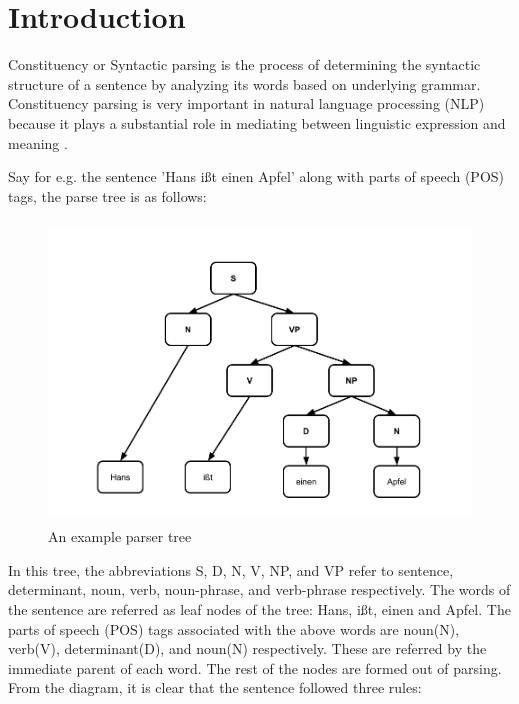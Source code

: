 \documentclass[a4paper, 11pt]{article}
\begin{document}
\tableofcontents
\pagebreak

\listoffigures
\pagebreak

\listoftables
\pagebreak

\clearpage

\section{Introduction}
\frenchspacing

Constituency or Syntactic parsing is the process of determining the syntactic structure of a sentence by analyzing its words based on underlying grammar. Constituency parsing is very important in natural language processing (NLP) because it plays a substantial role in mediating between linguistic expression and meaning \parencite*{Socher}. 

Say for e.g. the sentence 'Hans ißt einen Apfel' along with parts of speech (POS) tags, the parse tree is as follows:

\begin{figure}[htpb]
    \centering
    \includegraphics[width=\textwidth,height=8cm,keepaspectratio=true]
    {hans-eats-apples.png}
    \caption{
        An example parser tree
    }
    \label{fig:An example parser tree network}
\end{figure}

In this tree, the abbreviations S, D, N, V, NP, and VP refer to sentence, determinant, noun, verb, noun-phrase, and verb-phrase respectively. The words of the sentence are referred as leaf nodes of the tree: Hans, ißt, einen and Apfel. The parts of speech (POS) tags associated with the above words are noun(N), verb(V), determinant(D), and noun(N) respectively. These are referred by the immediate parent of each word. The rest of the nodes are formed out of parsing. From the diagram, it is clear that the sentence followed three rules:
\end{document}

